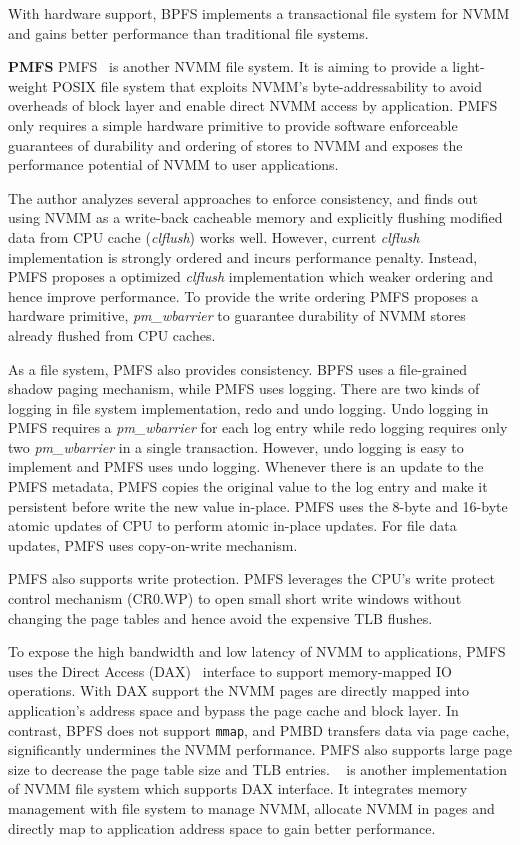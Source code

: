 With hardware support, BPFS implements a transactional file system for NVMM
and gains better performance than traditional file systems.


\textbf{PMFS} PMFS~\cite{PMFS} is another NVMM file system. It is aiming to
provide a
light-weight POSIX file system that exploits NVMM's byte-addressability to
avoid overheads of block layer and enable direct NVMM access by application.
PMFS only requires a simple hardware primitive to provide software enforceable
guarantees of durability and ordering of stores to NVMM and exposes the 
performance potential of NVMM to user applications.

The author analyzes several approaches to enforce consistency, and finds out
using NVMM as a write-back cacheable memory and explicitly flushing modified
data from CPU cache (\emph{clflush}) works well. However, current \emph{clflush}
implementation is strongly ordered and incurs performance penalty. Instead,
PMFS proposes a optimized \emph{clflush} implementation which weaker ordering
and hence improve performance. To provide the write ordering PMFS proposes
a hardware primitive, \emph{pm\_wbarrier} to guarantee durability of NVMM stores
already flushed from CPU caches.

As a file system, PMFS also provides consistency. BPFS uses a file-grained
shadow paging mechanism, while PMFS uses logging. There are two kinds of logging
in file system implementation, redo and undo logging. Undo logging in PMFS
requires a \emph{pm\_wbarrier} for each log entry while redo logging requires
only two \emph{pm\_wbarrier} in a single transaction. However, undo logging
is easy to implement and PMFS uses undo logging. Whenever there is an update
to the PMFS metadata, PMFS copies the original value to the log entry and
make it persistent before write the new value in-place. PMFS uses the
8-byte and 16-byte atomic updates of CPU to perform atomic in-place updates.
For file data updates, PMFS uses copy-on-write mechanism.

PMFS also supports write protection. PMFS leverages
the CPU's write protect control mechanism (CR0.WP) to open small short write
windows without changing the page tables and hence avoid the expensive
TLB flushes.

To expose the high bandwidth and low latency of NVMM to applications,
PMFS uses the Direct Access (DAX)~\cite{ext4dax} interface to support
memory-mapped
IO operations. With DAX support the NVMM pages are directly mapped into
application's address space and bypass the page cache and block layer.
In contrast, BPFS does not support \texttt{mmap}, and PMBD transfers
data via page cache, significantly undermines the NVMM performance.
PMFS also supports large page size to decrease the page table size and
TLB entries. ~\cite{mmfs} is another implementation of NVMM file system
which supports DAX interface. It integrates memory management with file system
to manage NVMM, allocate NVMM in pages and directly map to application
address space to gain better performance.

